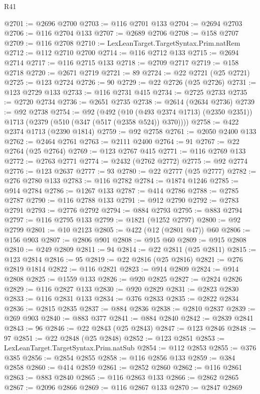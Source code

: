\begin{lexlean}{R41}
\begin{coremodule}
@2701 := @2696 @2700
@2703 := @116 @2701 @133
@2704 := @2694 @2703
@2706 := @116 @2704 @133
@2707 := @2689 @2706
@2708 := @158 @2707
@2709 := @116 @2708
@2710 := LexLeanTarget.TargetSyntax.Prim.natRem
@2712 := @112 @2710 @2700
@2714 := @116 @2712 @133
@2715 := @2694 @2714
@2717 := @116 @2715 @133
@2718 := @2709 @2717
@2719 := @158 @2718
@2720 := @2671 @2719
@2721 := 89
@2724 := @22 @2721 (@25 @2721)
@2725 := @123 @2724
@2726 := 90
@2729 := @22 @2726 (@25 @2726)
@2731 := @123 @2729 @133
@2733 := @116 @2731 @415
@2734 := @2725 @2733
@2735 := @2720 @2734
@2736 := @2651 @2735
@2738 := @2614 (@2634 @2736)
@2739 := @92 @2738
@2754 := @92
    (@492
      (@10 (@493 @2374 @1713) (@2350 @2351))
      @1713
      (@2379 (@510 (@347 (@517 (@2358 @524)) @370))))
@2758 := @422 @2374 @1713 (@2390 @1814)
@2759 := @92 @2758
@2761 := @2050 @2400 @133
@2762 := @2464 @2761
@2763 := @2111 @2400
@2764 := 91
@2767 := @22 @2764 (@25 @2764)
@2769 := @123 @2767 @415
@2771 := @116 @2769 @133
@2772 := @2763 @2771
@2774 := @2432 (@2762 @2772)
@2775 := @92 @2774
@2776 := @123 @2637
@2777 := 93
@2780 := @22 @2777 (@25 @2777)
@2782 := @276 @2780 @133
@2783 := @116 @2782
@2784 := @1874 @1246
@2785 := @914 @2784
@2786 := @1267 @133
@2787 := @414 @2786
@2788 := @2785 @2787
@2790 := @116 @2788 @133
@2791 := @912 @2790
@2792 := @2783 @2791
@2793 := @2776 @2792
@2794 := @884 @2793
@2795 := @883 @2794
@2797 := @116 @2795 @133
@2799 := @1821 (@1252 @2797)
@2800 := @92 @2799
@2801 := @10 @2123
@2805 := @422 (@12 (@2801 @47)) @60
@2806 := @156 @903
@2807 := @2806 @901
@2808 := @915 @60
@2809 := @915 @2808
@2810 := @249 @2809
@2811 := 94
@2814 := @22 @2811 (@25 @2811)
@2815 := @123 @2814
@2816 := 95
@2819 := @22 @2816 (@25 @2816)
@2821 := @276 @2819 @1814
@2822 := @116 @2821
@2823 := @914 @2809
@2824 := @914 @2808
@2825 := @1559 @133
@2826 := @920 @2825
@2827 := @2824 @2826
@2829 := @116 @2827 @133
@2830 := @920 @2829
@2831 := @2823 @2830
@2833 := @116 @2831 @133
@2834 := @376 @2833
@2835 := @2822 @2834
@2836 := @2815 @2835
@2837 := @884 @2836
@2838 := @2810 @2837
@2839 := @269 @903
@2840 := @883 @377
@2841 := @884 @2840
@2842 := @2839 @2841
@2843 := 96
@2846 := @22 @2843 (@25 @2843)
@2847 := @123 @2846
@2848 := 97
@2851 := @22 @2848 (@25 @2848)
@2852 := @123 @2851
@2853 := LexLeanTarget.TargetSyntax.Prim.natSub
@2854 := @112 @2853
@2855 := @376 @385
@2856 := @2854 @2855
@2858 := @116 @2856 @133
@2859 := @384 @2858
@2860 := @414 @2859
@2861 := @2852 @2860
@2862 := @116 @2861
@2863 := @883 @2840
@2865 := @116 @2863 @133
@2866 := @2862 @2865
@2867 := @2096 @2866
@2869 := @116 @2867 @133
@2870 := @2847 @2869

\end{coremodule}
\end{lexlean}
